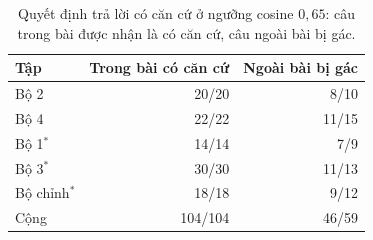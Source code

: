 \begin{table}[H]
\centering
\caption{Quyết định trả lời có căn cứ ở ngưỡng cosine $0{,}65$: câu trong bài được nhận là có căn cứ, câu ngoài bài bị gác.}\label{tab:rag-grounding}
\small
\begin{tabular}{lrr}
\toprule
Tập & Trong bài có căn cứ & Ngoài bài bị gác \\
\midrule
Bộ 2 & 20/20 & 8/10 \\
Bộ 4 & 22/22 & 11/15 \\
Bộ 1$^{*}$ & 14/14 & 7/9 \\
Bộ 3$^{*}$ & 30/30 & 11/13 \\
Bộ chỉnh$^{*}$ & 18/18 & 9/12 \\
\midrule
Cộng & 104/104 & 46/59 \\
\bottomrule
\end{tabular}
\end{table}
